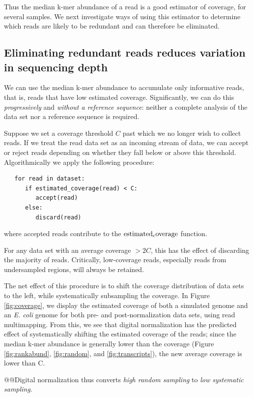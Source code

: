 \documentclass[10pt]{article}
\begin{document}
Thus the median k-mer abundance of a read is a good estimator of
coverage, for several samples.  We next investigate ways of using this
estimator to determine which reads are likely to be redundant and can
therefore be eliminated.

\subsection*{Eliminating redundant reads reduces variation in sequencing depth}

We can use the median k-mer abundance to accumulate only informative
reads, that is, reads that have low estimated coverage.
Significantly, we can do this {\em progressively} and {\em without a
  reference sequence}: neither a complete analysis of the data set nor
a reference sequence is required.

Suppose we set a coverage threshold $C$ past which we no longer wish
to collect reads. If we treat the read data set as an incoming stream
of data, we can accept or reject reads depending on whether they
fall below or above this threshold.  Algorithmically we apply the
following procedure:

\begin{verbatim}
   for read in dataset:
      if estimated_coverage(read) < C:
         accept(read)
      else:
         discard(read)
\end{verbatim}
\noindent
where accepted reads contribute to the $\rm estimated_coverage$ function.

For any data set with an average coverage $> 2C$, this has the effect
of discarding the majority of reads.  Critically, low-coverage reads,
especially reads from undersampled regions, will always be retained.

The net effect of this procedure is to shift the coverage distribution
of data sets to the left, while systematically subsampling the
coverage.  In Figure \ref{fig:coverage}, we display the estimated
coverage of both a simulated genome and an {\em E. coli} genome for
both pre- and post-normalization data sets, using read multimapping.
From this, we see that digital normalization has the predicted effect
of systematically shifting the estimated coverage of the reads; since
the median k-mer abundance is generally lower than the coverage
(Figure \ref{fig:rankabund}, \ref{fig:random}, and
\ref{fig:transcripts}), the new average coverage is lower than C.

@@Digital normalization thus
converts {\em high random sampling} to {\em low systematic sampling}.
\end{document}
